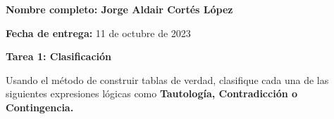 \documentclass[a4paper,12pt]{article} %
\begin{document}




\vspace*{0.1 cm}

\textbf{Nombre completo: Jorge Aldair Cortés López}
\begin{flushright}
\textbf{Fecha de entrega: }11 de octubre de 2023\\
\end{flushright}
 
\begin{center} %
    \vspace{2mm}
	{\Large \bf Tarea 1: Clasificación } %
	\vspace{1mm}
\end{center}  

\vspace{0.3cm}



Usando el método de construir tablas de verdad, clasifique cada una de las siguientes expresiones lógicas como \textbf{Tautología, Contradicción o Contingencia.}
\end{document}
